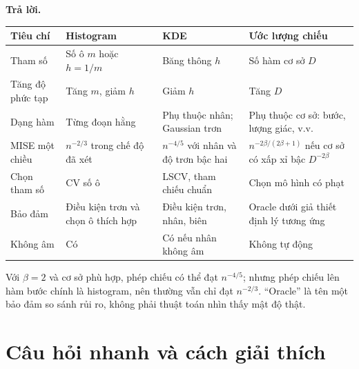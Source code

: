 \documentclass[11pt,a4paper]{article}
\begin{document}
\textbf{Trả lời.}
\begin{center}
\small
\renewcommand{\arraystretch}{1.3}
\begin{tabular}{>{\raggedright\arraybackslash}p{}>{\raggedright\arraybackslash}p{}>{\raggedright\arraybackslash}p{}>{\raggedright\arraybackslash}p{}}
\toprule
Tiêu chí & Histogram & KDE & Ước lượng chiếu\\
\midrule
Tham số & Số ô $m$ hoặc $h=1/m$ & Băng thông $h$ & Số hàm cơ sở $D$\\
Tăng độ phức tạp & Tăng $m$, giảm $h$ & Giảm $h$ & Tăng $D$\\
Dạng hàm & Từng đoạn hằng & Phụ thuộc nhân; Gaussian trơn & Phụ thuộc cơ sở: bước, lượng giác, v.v.\\
MISE một chiều & $n^{-2/3}$ trong chế độ đã xét & $n^{-4/5}$ với nhân và độ trơn bậc hai & $n^{-2\beta/(2\beta+1)}$ nếu cơ sở có xấp xỉ bậc $D^{-2\beta}$\\
Chọn tham số & CV số ô & LSCV, tham chiếu chuẩn & Chọn mô hình có phạt\\
Bảo đảm & Điều kiện trơn và chọn ô thích hợp & Điều kiện trơn, nhân, biên & Oracle dưới giả thiết định lý tương ứng\\
Không âm & Có & Có nếu nhân không âm & Không tự động\\
\bottomrule
\end{tabular}
\end{center}
Với $\beta=2$ và cơ sở phù hợp, phép chiếu có thể đạt $n^{-4/5}$; nhưng phép chiếu lên hàm bước chính là histogram, nên thường vẫn chỉ đạt $n^{-2/3}$. ``Oracle'' là tên một bảo đảm so sánh rủi ro, không phải thuật toán nhìn thấy mật độ thật.


\section{Câu hỏi nhanh và cách giải thích}
\end{document}
